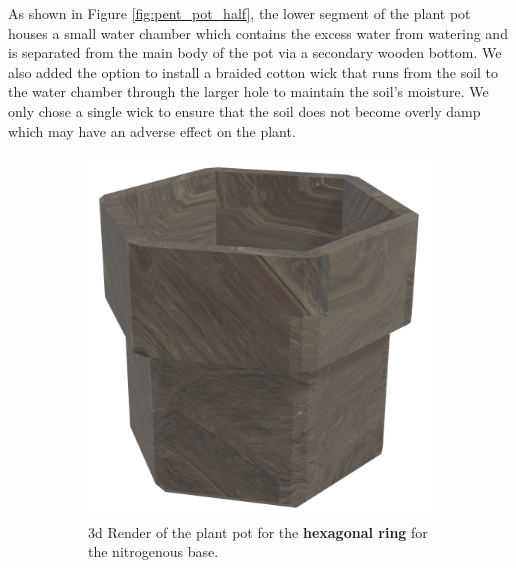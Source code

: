 \documentclass[12pt]{extarticle} %
\begin{document}
As shown in Figure \ref{fig:pent_pot_half}, the lower segment of the plant pot houses a small water chamber which contains the excess water from watering and is separated from the main body of the pot via a secondary wooden bottom. 
We also added the option to install a braided cotton wick that runs from the soil to the water chamber through the larger hole to maintain the soil's moisture. We only chose a single wick to ensure that the soil does not become overly damp which may have an adverse effect on the plant.
\clearpage
\begin{figure}[ht]
     \centering
     \begin{subfigure}[b]{0.45\textwidth}
         \centering
         \includegraphics[width=\textwidth]{images/screenshots/hexagonpot.png}
         \caption{3d Render of the plant pot for the \textbf{hexagonal ring} for the nitrogenous base.}
         \label{fig:hex_pot}
     \end{subfigure}
     \hfill
     \begin{subfigure}[b]{0.43\textwidth}
         \centering

\end{subfigure}
\end{figure}
\end{document}
